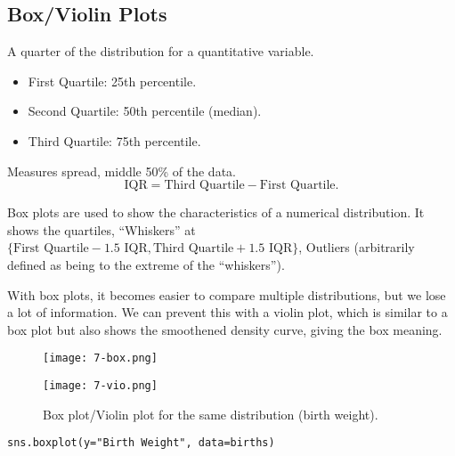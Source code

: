\subsection{Box/Violin Plots}
\begin{definition}[Quartile]{A quarter of the distribution for a quantitative variable.
\begin{itemize}
\item First Quartile: 25th percentile.
\item Second Quartile: 50th percentile (median).
\item Third Quartile: 75th percentile.
\end{itemize}
}
\end{definition}
\begin{definition}{Measures spread, middle 50\% of the data.
\[
\text{IQR} = \text{Third Quartile} - \text{First Quartile}
.\]
}
\end{definition}
Box plots are used to show the characteristics of a numerical distribution. It shows the quartiles, ``Whiskers'' at $\{\text{First Quartile} - 1.5 \text{ IQR}, \text{Third Quartile} + 1.5 \text{ IQR}\}$, Outliers (arbitrarily defined as being to the extreme of the ``whiskers'').

With box plots, it becomes easier to compare multiple distributions, but we lose a lot of information. We can prevent this with a violin plot, which is similar to a box plot but also shows the smoothened density curve, giving the box meaning.

\begin{figure}[ht]
\begin{minipage}{0.5\textwidth}
\centering 
\texttt{[image: 7-box.png]}
\end{minipage}%
\begin{minipage}{0.5\textwidth}
\centering
\texttt{[image: 7-vio.png]}
\end{minipage}
\centering\caption{Box plot/Violin plot for the same distribution (birth weight).}
\end{figure}
\begin{verbatim}
sns.boxplot(y="Birth Weight", data=births)
\end{verbatim}

